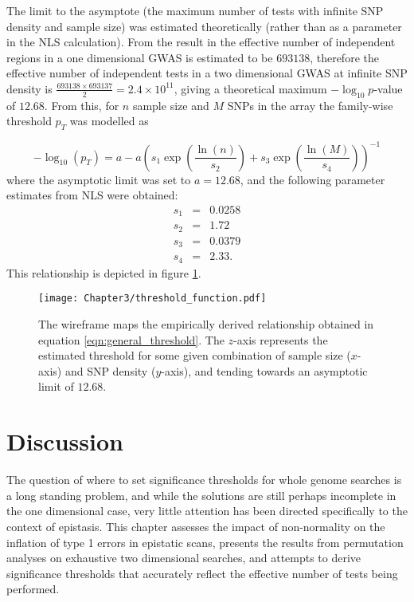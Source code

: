 The limit to the asymptote (the maximum number of tests with infinite SNP density and sample size) was estimated theoretically (rather than as a parameter in the NLS calculation). From the result in \citet{Dudbridge2008} the effective number of independent regions in a one dimensional GWAS is estimated to be $693138$, therefore the effective number of independent tests in a two dimensional GWAS at infinite SNP density is $\frac{693138 \times 693137} {2} = 2.4 \times 10^{11}$, giving a theoretical maximum $-\log_{10} p$-value of $12.68$. From this, for $n$ sample size and $M$ SNPs in the array the family-wise threshold $p_{T}$ was modelled as 

\begin{equation}
-\log_{10}(p_{T}) = a - a \left ( 
 s_{1} \exp \left ( 
  \frac {\ln(n) } { s_{2} } \right )
 + s_{3} \exp \left (
  \frac{ \ln(M)} {s_{4}} \right ) 
\right )^{-1}
\label{eqn:general_threshold}
\end{equation}
where the asymptotic limit was set to $a = 12.68$, and the following parameter estimates from NLS were obtained:
\begin{eqnarray}
s_{1} & = & 0.0258 \nonumber \\
s_{2} & = & 1.72 \nonumber \\
s_{3} & = & 0.0379 \nonumber \\
s_{4} & = & 2.33. \nonumber
\end{eqnarray}
This relationship is depicted in figure \ref{fig:threshold_function}.

\begin{figure}
\begin{center}
\texttt{[image: Chapter3/threshold\_function.pdf]}
\caption[Estimation of 2D thresholds in the general case]{The wireframe maps the empirically derived relationship obtained in equation \ref{eqn:general_threshold}. The $z$-axis represents the estimated threshold for some given combination of sample size ($x$-axis) and SNP density ($y$-axis), and tending towards an asymptotic limit of $12.68$.}
\label{fig:threshold_function}
\end{center}
\end{figure}


\section{Discussion}

The question of where to set significance thresholds for whole genome searches is a long standing problem, and while the solutions are still perhaps incomplete in the one dimensional case, very little attention has been directed specifically to the context of epistasis. This chapter assesses the impact of non-normality on the inflation of type 1 errors in epistatic scans, presents the results from permutation analyses on exhaustive two dimensional searches, and attempts to derive significance thresholds that accurately reflect the effective number of tests being performed.

